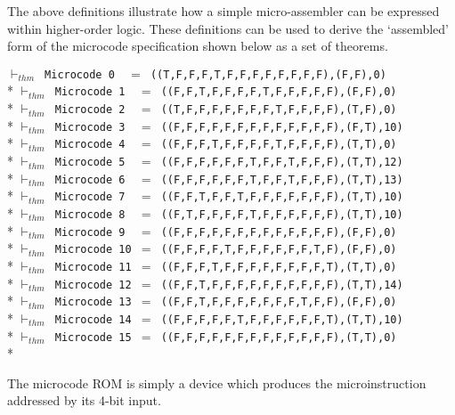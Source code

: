 \begin{normalsize}
The above definitions illustrate how a simple
micro-assembler can be expressed within higher-order logic.
These definitions can be used to derive
the `assembled' form of the microcode specification shown
below as a set of theorems.

\hspace*{\fill}
\begin{minipage}{17cm}
$\vdash_{thm}$\verb" Microcode 0  "$=$\verb" ((T,F,F,F,T,F,F,F,F,F,F,F,F),(F,F),0)"\\*
$\vdash_{thm}$\verb" Microcode 1  "$=$\verb" ((F,F,T,F,F,F,F,T,F,F,F,F,F),(F,F),0)"\\*
$\vdash_{thm}$\verb" Microcode 2  "$=$\verb" ((T,F,F,F,F,F,F,F,T,F,F,F,F),(T,F),0)"\\*
$\vdash_{thm}$\verb" Microcode 3  "$=$\verb" ((F,F,F,F,F,F,F,F,F,F,F,F,F),(F,T),10)"\\*
$\vdash_{thm}$\verb" Microcode 4  "$=$\verb" ((F,F,F,T,F,F,F,F,T,F,F,F,F),(T,T),0)"\\*
$\vdash_{thm}$\verb" Microcode 5  "$=$\verb" ((F,F,F,F,F,F,T,F,F,T,F,F,F),(T,T),12)"\\*
$\vdash_{thm}$\verb" Microcode 6  "$=$\verb" ((F,F,F,F,F,F,T,F,F,T,F,F,F),(T,T),13)"\\*
$\vdash_{thm}$\verb" Microcode 7  "$=$\verb" ((F,F,T,F,F,T,F,F,F,F,F,F,F),(T,T),10)"\\*
$\vdash_{thm}$\verb" Microcode 8  "$=$\verb" ((F,T,F,F,F,F,T,F,F,F,F,F,F),(T,T),10)"\\*
$\vdash_{thm}$\verb" Microcode 9  "$=$\verb" ((F,F,F,F,F,F,F,F,F,F,F,F,F),(F,F),0)"\\*
$\vdash_{thm}$\verb" Microcode 10 "$=$\verb" ((F,F,F,F,T,F,F,F,F,F,F,T,F),(F,F),0)"\\*
$\vdash_{thm}$\verb" Microcode 11 "$=$\verb" ((F,F,F,T,F,F,F,F,F,F,F,F,T),(T,T),0)"\\*
$\vdash_{thm}$\verb" Microcode 12 "$=$\verb" ((F,F,T,F,F,F,F,F,F,F,F,F,F),(T,T),14)"\\*
$\vdash_{thm}$\verb" Microcode 13 "$=$\verb" ((F,F,T,F,F,F,F,F,F,F,T,F,F),(F,F),0)"\\*
$\vdash_{thm}$\verb" Microcode 14 "$=$\verb" ((F,F,F,F,F,T,F,F,F,F,F,F,T),(T,T),10)"\\*
$\vdash_{thm}$\verb" Microcode 15 "$=$\verb" ((F,F,F,F,F,F,F,F,F,F,F,F,F),(T,T),0)"\\*
\end{minipage}
\hspace*{\fill}

The microcode ROM is simply a device which produces
the microinstruction addressed by its 4-bit input.


\end{normalsize}
